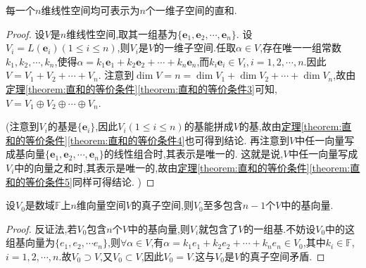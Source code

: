 \documentclass[lang=cn,newtx,10pt,scheme=chinese]{elegantbook}
\begin{document}
\begin{proposition}\label{proposition:n维线性空间的一维直和分解}
每一个\(n\)维线性空间均可表示为\(n\)个一维子空间的直和.
\end{proposition}
\begin{proof}
设\(V\)是\(n\)维线性空间,取其一组基为\(\{\boldsymbol{e}_1,\boldsymbol{e}_2,\cdots,\boldsymbol{e}_n\}\). 设\(V_i = L(\boldsymbol{e}_i)(1\leq i\leq n)\),则\(V_i\)是\(V\)的一维子空间.任取$\alpha\in V$,存在唯一一组常数$k_1,k_2,\cdots,k_n$,使得$\alpha =k_1\boldsymbol{e}_1+k_2\boldsymbol{e}_2+\cdots +k_n\boldsymbol{e}_n$,而$k_i\boldsymbol{e}_i\in V_i,i=1,2,\cdots ,n.$因此\(V = V_1 + V_2+\cdots+V_n\). 注意到\(\dim V = n=\dim V_1+\dim V_2+\cdots+\dim V_n\),故由\hyperref[theorem:直和的等价条件3]{定理\ref{theorem:直和的等价条件}\ref{theorem:直和的等价条件3}}可知,\(V = V_1\oplus V_2\oplus\cdots\oplus V_n\). 

(注意到\(V_i\)的基是\(\{\boldsymbol{e}_i\}\),因此\(V_i(1\leq i\leq n)\)的基能拼成\(V\)的基,故由\hyperref[theorem:直和的等价条件4]{定理\ref{theorem:直和的等价条件}\ref{theorem:直和的等价条件4}}也可得到结论. 再注意到\(V\)中任一向量写成基向量\(\{\boldsymbol{e}_1,\boldsymbol{e}_2,\cdots,\boldsymbol{e}_n\}\)的线性组合时,其表示是唯一的. 这就是说,\(V\)中任一向量写成\(V_i\)中的向量之和时,其表示是唯一的,故由\hyperref[theorem:直和的等价条件5]{定理\ref{theorem:直和的等价条件}\ref{theorem:直和的等价条件5}}同样可得结论. )
\end{proof}

\begin{proposition}\label{proposition:真子空间至多包含n-1个基向量}
设\(V_0\)是数域\(\mathbb{F}\)上$n$维向量空间\(V\)的真子空间,则\(V_0\)至多包含$n-1$个$V$中的基向量.
\end{proposition}
\begin{proof}
反证法,若$V_0$包含\(n\)个\(V\)中的基向量,则$V_i$就包含了$V$的一组基.不妨设$V_0$中的这组基向量为$\{e_1,e_2,\cdots e_n\}$,则$\forall \alpha\in V$,有$\alpha =k_1e_1+k_2e_2+\cdots +k_ne_n \in V_0$,其中$k_i\in \mathbb{F}$,$i=1,2,\cdots,n$.故$V_0\supset V$,又$V_0\subset V$,因此$V_0=V$.这与\(V_0\)是\(V\)的真子空间矛盾.
\end{proof}
\end{document}
